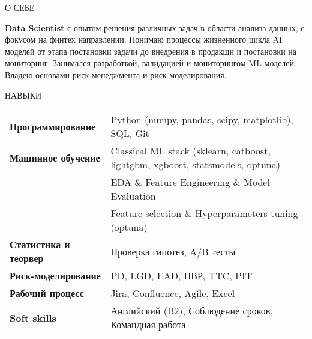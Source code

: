 \documentclass{resume} %
\begin{document}
\large
\begin{rSection}{О СЕБЕ} %

{\textbf{Data Scientist} с опытом решения различных задач в области анализа данных, с фокусом на финтех направлении. Понимаю процессы жизненного цикла AI моделей от этапа постановки задачи до внедрения в продакшн и постановки на мониторинг. Занимался разработкой, валидацией и мониторингом ML моделей. Владею основами риск-менеджмента и риск-моделирования.} %

\end{rSection}

\begin{rSection}{НАВЫКИ} %

\begin{tabular}{ @{} >{\bfseries}l @{\hspace{3ex}} p{} }
Программирование & Python (numpy, pandas, scipy, matplotlib), SQL, Git %
\\
Машинное обучение
& Classical ML stack (sklearn, catboost, lightgbm, xgboost, statsmodels, optuna)
\\
&  EDA \& Feature Engineering \& Model Evaluation%
\\
& Feature selection \& Hyperparameters tuning (optuna) %
\\
Статистика и теорвер & Проверка гипотез, A/B тесты %
\\
Риск-моделирование & PD, LGD, EAD, ПВР, TTC, PIT %
\\
Рабочий процесс & Jira, Confluence, Agile, Excel %
\\
Soft skills & Английский (B2), Соблюдение сроков, Командная работа %
\\
\end{tabular}\\

\end{rSection}
\end{document}
